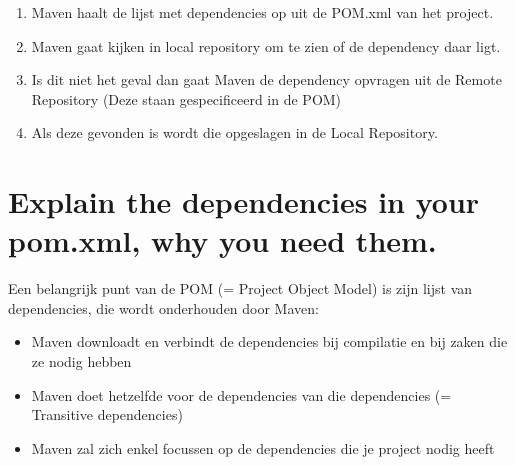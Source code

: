 \begin{enumerate}
	\item Maven haalt de lijst met dependencies op uit de POM.xml van het project.
	\item Maven gaat kijken in local repository om te zien of de dependency daar ligt.
	\item Is dit niet het geval dan gaat Maven de dependency opvragen uit de Remote Repository (Deze staan gespecificeerd in de POM)
	\item Als deze gevonden is wordt die opgeslagen in de Local Repository.
\end{enumerate}

\section{Explain the dependencies in your pom.xml, why you need them.}
Een belangrijk punt van de POM (= Project Object Model) is zijn lijst van dependencies, die wordt onderhouden door Maven:
\begin{itemize}
	\item Maven downloadt en verbindt de dependencies bij compilatie en bij zaken die ze nodig hebben
	\item Maven doet hetzelfde voor de dependencies van die dependencies (= Transitive dependencies)
	\item Maven zal zich enkel focussen op de dependencies die je project nodig heeft
\end{itemize}






